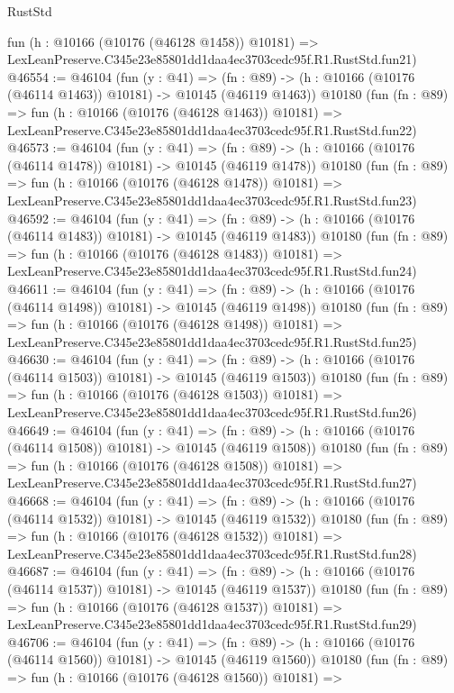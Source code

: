 \begin{lexlean}{RustStd}
\begin{coremodule}
    fun (h : @10166 (@10176 (@46128 @1458)) @10181) =>
    LexLeanPreserve.C345e23e85801dd1daa4ec3703cedc95f.R1.RustStd.fun21)
@46554 := @46104
    (fun (y : @41) =>
    (fn : @89) -> (h : @10166 (@10176 (@46114 @1463)) @10181) -> @10145 (@46119 @1463))
    @10180
    (fun (fn : @89) =>
    fun (h : @10166 (@10176 (@46128 @1463)) @10181) =>
    LexLeanPreserve.C345e23e85801dd1daa4ec3703cedc95f.R1.RustStd.fun22)
@46573 := @46104
    (fun (y : @41) =>
    (fn : @89) -> (h : @10166 (@10176 (@46114 @1478)) @10181) -> @10145 (@46119 @1478))
    @10180
    (fun (fn : @89) =>
    fun (h : @10166 (@10176 (@46128 @1478)) @10181) =>
    LexLeanPreserve.C345e23e85801dd1daa4ec3703cedc95f.R1.RustStd.fun23)
@46592 := @46104
    (fun (y : @41) =>
    (fn : @89) -> (h : @10166 (@10176 (@46114 @1483)) @10181) -> @10145 (@46119 @1483))
    @10180
    (fun (fn : @89) =>
    fun (h : @10166 (@10176 (@46128 @1483)) @10181) =>
    LexLeanPreserve.C345e23e85801dd1daa4ec3703cedc95f.R1.RustStd.fun24)
@46611 := @46104
    (fun (y : @41) =>
    (fn : @89) -> (h : @10166 (@10176 (@46114 @1498)) @10181) -> @10145 (@46119 @1498))
    @10180
    (fun (fn : @89) =>
    fun (h : @10166 (@10176 (@46128 @1498)) @10181) =>
    LexLeanPreserve.C345e23e85801dd1daa4ec3703cedc95f.R1.RustStd.fun25)
@46630 := @46104
    (fun (y : @41) =>
    (fn : @89) -> (h : @10166 (@10176 (@46114 @1503)) @10181) -> @10145 (@46119 @1503))
    @10180
    (fun (fn : @89) =>
    fun (h : @10166 (@10176 (@46128 @1503)) @10181) =>
    LexLeanPreserve.C345e23e85801dd1daa4ec3703cedc95f.R1.RustStd.fun26)
@46649 := @46104
    (fun (y : @41) =>
    (fn : @89) -> (h : @10166 (@10176 (@46114 @1508)) @10181) -> @10145 (@46119 @1508))
    @10180
    (fun (fn : @89) =>
    fun (h : @10166 (@10176 (@46128 @1508)) @10181) =>
    LexLeanPreserve.C345e23e85801dd1daa4ec3703cedc95f.R1.RustStd.fun27)
@46668 := @46104
    (fun (y : @41) =>
    (fn : @89) -> (h : @10166 (@10176 (@46114 @1532)) @10181) -> @10145 (@46119 @1532))
    @10180
    (fun (fn : @89) =>
    fun (h : @10166 (@10176 (@46128 @1532)) @10181) =>
    LexLeanPreserve.C345e23e85801dd1daa4ec3703cedc95f.R1.RustStd.fun28)
@46687 := @46104
    (fun (y : @41) =>
    (fn : @89) -> (h : @10166 (@10176 (@46114 @1537)) @10181) -> @10145 (@46119 @1537))
    @10180
    (fun (fn : @89) =>
    fun (h : @10166 (@10176 (@46128 @1537)) @10181) =>
    LexLeanPreserve.C345e23e85801dd1daa4ec3703cedc95f.R1.RustStd.fun29)
@46706 := @46104
    (fun (y : @41) =>
    (fn : @89) -> (h : @10166 (@10176 (@46114 @1560)) @10181) -> @10145 (@46119 @1560))
    @10180
    (fun (fn : @89) =>
    fun (h : @10166 (@10176 (@46128 @1560)) @10181) =>

\end{coremodule}
\end{lexlean}
